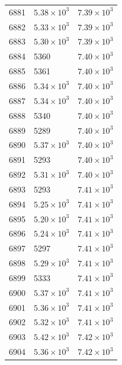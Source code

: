 \begin{table}[H]
\begin{tabular}{lll}
6881 & $\displaystyle 5.38 \times 10^{3}$ & $\displaystyle 7.39 \times 10^{3}$ \\
6882 & $\displaystyle 5.33 \times 10^{3}$ & $\displaystyle 7.39 \times 10^{3}$ \\
6883 & $\displaystyle 5.30 \times 10^{3}$ & $\displaystyle 7.39 \times 10^{3}$ \\
6884 & 5360 & $\displaystyle 7.40 \times 10^{3}$ \\
6885 & 5361 & $\displaystyle 7.40 \times 10^{3}$ \\
6886 & $\displaystyle 5.34 \times 10^{3}$ & $\displaystyle 7.40 \times 10^{3}$ \\
6887 & $\displaystyle 5.34 \times 10^{3}$ & $\displaystyle 7.40 \times 10^{3}$ \\
6888 & 5340 & $\displaystyle 7.40 \times 10^{3}$ \\
6889 & 5289 & $\displaystyle 7.40 \times 10^{3}$ \\
6890 & $\displaystyle 5.37 \times 10^{3}$ & $\displaystyle 7.40 \times 10^{3}$ \\
6891 & 5293 & $\displaystyle 7.40 \times 10^{3}$ \\
6892 & $\displaystyle 5.31 \times 10^{3}$ & $\displaystyle 7.40 \times 10^{3}$ \\
6893 & 5293 & $\displaystyle 7.41 \times 10^{3}$ \\
6894 & $\displaystyle 5.25 \times 10^{3}$ & $\displaystyle 7.41 \times 10^{3}$ \\
6895 & $\displaystyle 5.20 \times 10^{3}$ & $\displaystyle 7.41 \times 10^{3}$ \\
6896 & $\displaystyle 5.24 \times 10^{3}$ & $\displaystyle 7.41 \times 10^{3}$ \\
6897 & 5297 & $\displaystyle 7.41 \times 10^{3}$ \\
6898 & $\displaystyle 5.29 \times 10^{3}$ & $\displaystyle 7.41 \times 10^{3}$ \\
6899 & 5333 & $\displaystyle 7.41 \times 10^{3}$ \\
6900 & $\displaystyle 5.37 \times 10^{3}$ & $\displaystyle 7.41 \times 10^{3}$ \\
6901 & $\displaystyle 5.36 \times 10^{3}$ & $\displaystyle 7.41 \times 10^{3}$ \\
6902 & $\displaystyle 5.32 \times 10^{3}$ & $\displaystyle 7.41 \times 10^{3}$ \\
6903 & $\displaystyle 5.42 \times 10^{3}$ & $\displaystyle 7.42 \times 10^{3}$ \\
6904 & $\displaystyle 5.36 \times 10^{3}$ & $\displaystyle 7.42 \times 10^{3}$ \\

\end{tabular}
\end{table}
